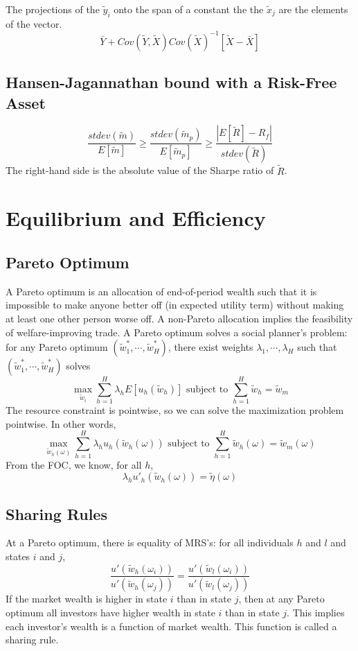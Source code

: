 \documentclass[11pt, a4paper, oneside]{article}
\theoremstyle{definition}
\theoremstyle{proposition}
\theoremstyle{corollary}
\theoremstyle{lemma}
\theoremstyle{theorem}
\begin{document}
The projections of the $\tilde{y}_i$ onto the span of a constant the the $\tilde{x}_j$ are the elements of the vector. 
$$\bar{Y} + Cov(\tilde{Y}, \tilde{X})Cov(\tilde{X})^{-1}[\tilde{X} - \bar{X}]$$

\subsection{Hansen-Jagannathan bound with a Risk-Free Asset}
$$\frac{stdev(\tilde{m})}{E[\tilde{m}]} \geq \frac{stdev(\tilde{m}_p)}{E[\tilde{m}_p]} \geq \frac{|E[\tilde{R}] - R_f|}{stdev(\tilde{R})}$$
The right-hand side is the absolute value of the Sharpe ratio of $\tilde{R}$. 

\section{Equilibrium and Efficiency}
\subsection{Pareto Optimum}
A Pareto optimum is an allocation of end-of-period wealth such that it is impossible to make anyone better off (in expected utility term) without making at least one other person worse off. A non-Pareto allocation implies the feasibility of welfare-improving trade. A Pareto optimum solves a social planner's problem: for any Pareto optimum $(\tilde{w}_1^*, \cdots, \tilde{w}_H^*)$, there exist weights $\lambda_1, \cdots, \lambda_H$ such that $(\tilde{w}_1^*, \cdots, \tilde{w}_H^*)$ solves
$$\max_{\tilde{w}_i} \sum_{h=1}^H \lambda_hE[u_h(\tilde{w}_h)] \text{ subject to } \sum_{h=1}^H \tilde{w}_h = \tilde{w}_m$$
The resource constraint is pointwise, so we can solve the maximization problem pointwise. In other words, 
$$\max_{\tilde{w}_h(\omega)} \sum_{h=1}^H \lambda_hu_h(\tilde{w}_h(\omega))\text{ subject to } \sum_{h=1}^H \tilde{w}_h(\omega) = \tilde{w}_m(\omega)$$
From the FOC, we know, for all $h$, 
$$\lambda_hu'_h(\tilde{w}_h(\omega)) = \tilde{\eta}(\omega)$$ 

\subsection{Sharing Rules}
At a Pareto optimum, there is equality of MRS's: for all individuals $h$ and $l$ and states $i$ and $j$,
$$\frac{u'(\tilde{w}_h(\omega_i))}{u'(\tilde{w}_h(\omega_j))} = \frac{u'(\tilde{w}_l(\omega_i))}{u'(\tilde{w}_l(\omega_j))}$$
If the market wealth is higher in state $i$ than in state $j$, then at any Pareto optimum all investors have higher wealth in state $i$ than in state $j$. This implies each investor's wealth is a function of market wealth. This function is called a sharing rule. 
\end{document}
